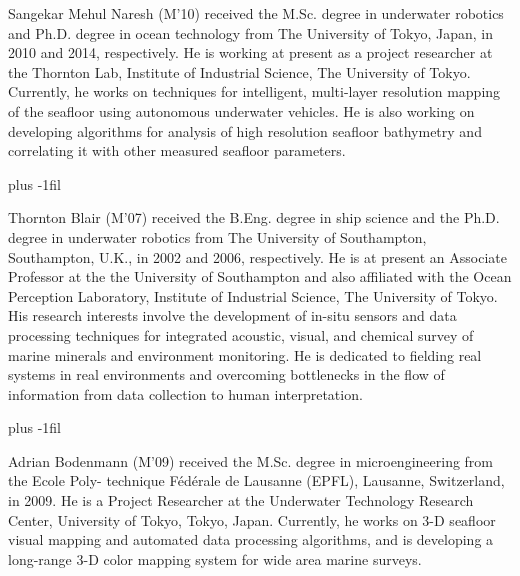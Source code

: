 \begin{IEEEbiography}{Sangekar Mehul Naresh}
(M’10) received the M.Sc. degree in underwater robotics and Ph.D. degree in ocean technology from The University of Tokyo, Japan, in 2010 and 2014, respectively. He is  working at present as a project researcher at the Thornton Lab, Institute of Industrial Science, The University of Tokyo. Currently, he works on techniques for intelligent, multi-layer resolution mapping of the seafloor using autonomous underwater vehicles. He is also working on developing algorithms for analysis of high resolution seafloor bathymetry and correlating it with other measured seafloor parameters.  
\end{IEEEbiography}

\vskip 0pt plus -1fil

\begin{IEEEbiography}{Thornton Blair}
(M’07) received the B.Eng. degree in ship science and the Ph.D. degree in underwater robotics from The University of Southampton, Southampton, U.K., in 2002 and 2006, respectively. He is at present an Associate Professor at the the University of Southampton and also affiliated with the  Ocean Perception Laboratory, Institute of Industrial Science, The University of Tokyo. His research interests involve the development of in-situ sensors and data processing techniques for integrated acoustic, visual, and chemical survey of marine minerals and environment monitoring. He is dedicated to fielding real systems in real environments and overcoming bottlenecks in the flow of information from data collection to human interpretation.
\end{IEEEbiography}

\vskip 0pt plus -1fil

\begin{IEEEbiography}{Adrian Bodenmann}
(M’09) received the M.Sc. degree in microengineering from the Ecole Poly- technique Fédérale de Lausanne (EPFL), Lausanne, Switzerland, in 2009. He is a Project Researcher at the Underwater Technology Research Center, University of Tokyo, Tokyo, Japan. Currently, he works on 3-D seafloor visual mapping and automated data processing algorithms, and is developing a long-range 3-D color mapping system for wide area marine surveys.
\end{IEEEbiography}

